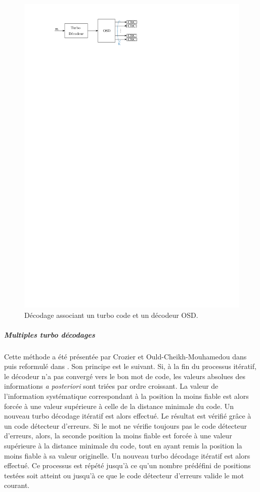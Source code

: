 \begin{figure}[tb]
\begin{center}
	\includegraphics[]{main/ch1_fig/abaiss/osd.pdf}
	\end{center}
	\caption{Décodage associant un turbo code et un décodeur OSD. \label{fig:osd}}
\end{figure}

\subparagraph{Multiples turbo décodages} Cette méthode a été présentée par Crozier et Ould-Cheikh-Mouhamedou dans 
\cite{cim} puis reformulé dans \cite{fsm}. Son principe est le suivant. Si, à la fin du processus itératif, le décodeur 
n'a pas convergé vers le bon mot de code, les valeurs absolues des informations \textit{a posteriori} sont triées par 
ordre croissant. La valeur de l'information systématique correspondant à la position la moins fiable est alors forcée à 
une valeur supérieure à celle de la distance minimale du code. Un nouveau turbo décodage itératif est alors effectué. Le 
résultat est vérifié grâce à un code détecteur d'erreurs. Si le mot ne vérifie toujours pas le code détecteur d'erreurs, alors, la seconde position 
la moins fiable est forcée à une valeur supérieure à la distance minimale du code, tout en ayant remis la position la moins 
fiable à sa valeur originelle. Un nouveau turbo décodage itératif est alors effectué. Ce processus est répété jusqu'à ce 
qu'un nombre prédéfini de positions testées soit atteint ou jusqu'à ce que le code détecteur d'erreurs valide le mot courant.

